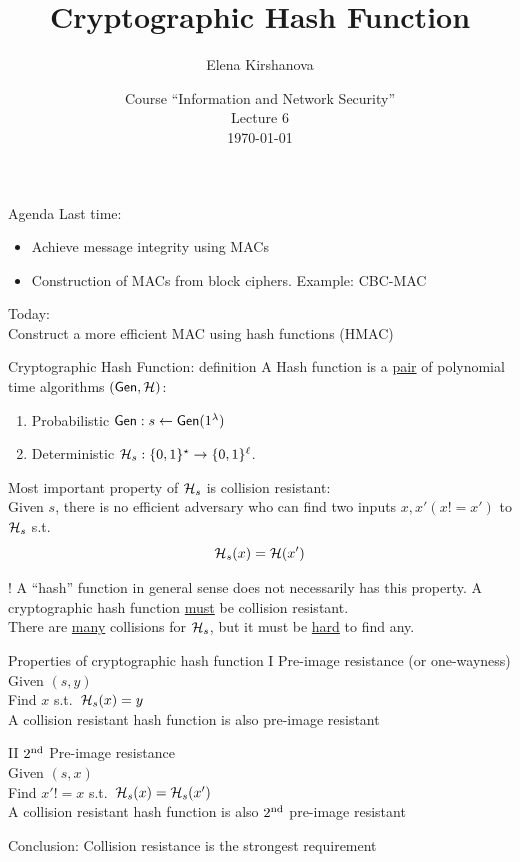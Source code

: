 \documentclass[usenames,dvipsnames, 9pt]{beamer}
\author{Elena Kirshanova \\ [10pt]
}
\title{\Huge Cryptographic Hash Function}
\date{ Course ``Information and Network Security'' \\ 	
	Lecture 6 \\ \today }
\begin{document}
	
\begin{frame}
	\titlepage
\end{frame}

\begin{frame}{Agenda}
	\Large 
	Last time:
	\begin{itemize}
		\item Achieve message integrity using MACs
		\item Construction of MACs from block ciphers. Example: CBC-MAC
	\end{itemize}
	\vspace{20pt}
	Today: \\
	
	Construct a more efficient MAC using {\color{Orange} hash functions (HMAC)}
\end{frame}

\begin{frame}{Cryptographic Hash Function: definition}
\Large
	A {\color{Orange}Hash function} is a \underline{pair} of polynomial time algorithms $(\textsf{Gen}, \mathcal{H})$:
	\begin{enumerate}
		\itemsep 7pt
		\item Probabilistic $\textsf{Gen}: s \leftarrow \textsf{Gen}(1^\lambda)$  
		\item Deterministic $\mathcal{H}_s: \{0,1\}^\star \rightarrow \{0,1\}^\ell$.
	\end{enumerate}
\pause
\vspace{10pt}
Most important property of $\mathcal{H}_s$ is {\color{Orange} collision resistant:}\\
Given $s$, there is no efficient adversary who can find two inputs $x, x' (x!=x')$ to $\mathcal{H}_s$ s.t.
\[
	\mathcal{H}_s(x) = \mathcal{H}(x')
\]

{\color{Orange} !} A ``hash'' function in general sense does not necessarily has this property. A {\color{Orange} cryptographic} hash function \underline{must} be collision resistant.\\[5pt]

There are \underline{many} collisions for $\mathcal{H}_s$, but it must be \underline{hard} to find any.
\end{frame}

\begin{frame}{Properties of cryptographic hash function}
\Large 
	{\color{Orange} I} Pre-image  resistance  (or one-wayness) \\[5pt]
	Given $(s, y)$\\
	Find $x$ s.t.\ $\mathcal{H}_s(x) =  y$ \\[5pt]
	{\color{Orange} A collision resistant hash function is also pre-image resistant}
	
	\pause 
	\vspace{20pt}
	{\color{Orange} II} $2^{\mathrm{nd}}$ Pre-image  resistance \\[5pt]
	Given $(s, x)$\\
	Find $x'!=x$ s.t.\ $\mathcal{H}_s(x) =  \mathcal{H}_s(x')$ \\[5pt]
	{\color{Orange} A collision resistant hash function is also  $2^{\mathrm{nd}}$  pre-image resistant}
	
	\vspace{20pt}
	\LARGE Conclusion: Collision resistance is the strongest requirement
\end{frame}
\end{document}
